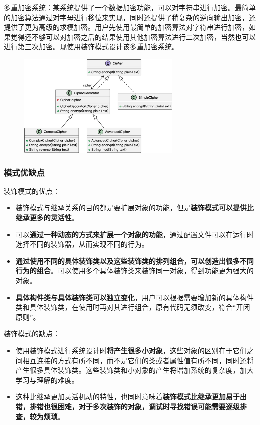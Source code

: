 多重加密系统：某系统提供了一个数据加密功能，可以对字符串进行加密。最简单的加密算法通过对字母进行移位来实现，同时还提供了稍复杂的逆向输出加密，还提供了更为高级的求模加密。用户先使用最简单的加密算法对字符串进行加密，如果觉得还不够可以对加密之后的结果使用其他加密算法进行二次加密，当然也可以进行第三次加密。现使用装饰模式设计该多重加密系统。
\begin{figure}[H]
    \vspace{-0.5em}
	\centering
	\includegraphics[width=0.7\textwidth]{images/装饰模式实例2.eps}
    \vspace{-1em}
\end{figure}

\subsubsection{模式优缺点}
装饰模式的优点：
\begin{itemize}
    \item 装饰模式与继承关系的目的都是要扩展对象的功能，但是\textbf{装饰模式可以提供比继承更多的灵活性}。
    \item 可以\textbf{通过一种动态的方式来扩展一个对象的功能}，通过配置文件可以在运行时选择不同的装饰器，从而实现不同的行为。
    \item \textbf{通过使用不同的具体装饰类以及这些装饰类的排列组合，可以创造出很多不同行为的组合}。可以使用多个具体装饰类来装饰同一对象，得到功能更为强大的对象。
    \item \textbf{具体构件类与具体装饰类可以独立变化}，用户可以根据需要增加新的具体构件类和具体装饰类，在使用时再对其进行组合，原有代码无须改变，符合“开闭原则”。
\end{itemize}

装饰模式的缺点：
\begin{itemize}
    \item 使用装饰模式进行系统设计时\textbf{将产生很多小对象}，这些对象的区别在于它们之间相互连接的方式有所不同，而不是它们的类或者属性值有所不同，同时还将产生很多具体装饰类。这些装饰类和小对象的产生将增加系统的复杂度，加大学习与理解的难度。
    \item 这种比继承更加灵活机动的特性，也同时意味着\textbf{装饰模式比继承更加易于出错，排错也很困难，对于多次装饰的对象，调试时寻找错误可能需要逐级排查，较为烦琐}。
\end{itemize}


